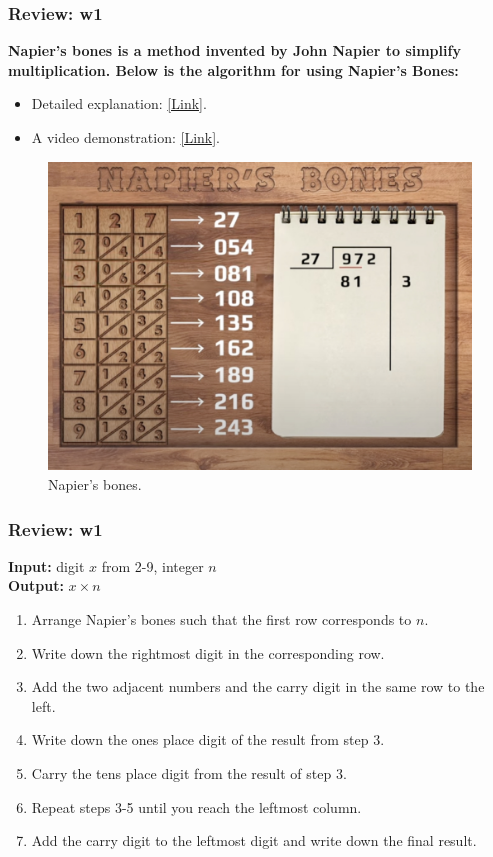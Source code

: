 \documentclass[
	11pt, %
]{beamer}
\begin{document}
\begin{frame}
	\frametitle{Review: w1}

	\textbf{Napier's bones is a method invented by John Napier to simplify multiplication. Below is the algorithm for using Napier's Bones:}

 \begin{itemize}
    \item Detailed explanation: \href{https://mathworld.wolfram.com/NapiersBones.html}{[Link]}.
    \item A video demonstration: \href{https://www.youtube.com/watch?v=Ds21S3fCfYM}{[Link]}.
\end{itemize}


	\begin{figure}
		\includegraphics[width=0.8\linewidth]{napier.jpg}
		\caption{Napier's bones.}
	\end{figure}



\end{frame}


\begin{frame}
	\frametitle{Review: w1}

	\textbf{Input:} digit $x$ from 2-9, integer $n$ \\
\textbf{Output:} $x \times n$

\begin{enumerate}
    \item Arrange Napier's bones such that the first row corresponds to $n$.
    \item Write down the rightmost digit in the corresponding row.
    \item Add the two adjacent numbers and the carry digit in the same row to the left.
    \item Write down the ones place digit of the result from step 3.
    \item Carry the tens place digit from the result of step 3.
    \item Repeat steps 3-5 until you reach the leftmost column.
    \item Add the carry digit to the leftmost digit and write down the final result.
\end{enumerate}

\end{frame}
\end{document}
